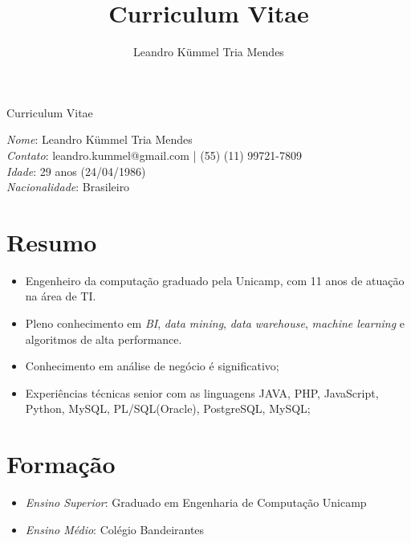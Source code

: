\documentclass[a4paper,11pt]{article}
\title{Curriculum Vitae}
\author{Leandro Kümmel Tria Mendes}
\begin{document}
\begin{center} 
Curriculum Vitae
\end{center} 
\emph{Nome}: Leandro Kümmel Tria Mendes\\
\emph{Contato}: leandro.kummel@gmail.com | (55) (11) 99721-7809\\
\emph{Idade}: 29 anos (24/04/1986)\\
\emph{Nacionalidade}: Brasileiro\\
\section{Resumo}
\begin{itemize}
\item Engenheiro da computação graduado pela Unicamp, com 11 anos de atuação na área de TI.
\item Pleno conhecimento em  \textit{BI}, \textit{data mining}, \textit{data warehouse}, \textit{machine learning} e algoritmos de alta performance.
\item Conhecimento em análise de negócio é significativo;
\item Experiências técnicas senior com as linguagens JAVA, PHP, JavaScript, Python, MySQL, PL/SQL(Oracle), PostgreSQL, MySQL;
\end{itemize}

\section{Formação}
\begin{itemize}
\item \emph{Ensino Superior}: Graduado em Engenharia de Computação Unicamp 
\item \emph{Ensino Médio}: Colégio Bandeirantes

\end{itemize}
\end{document}
